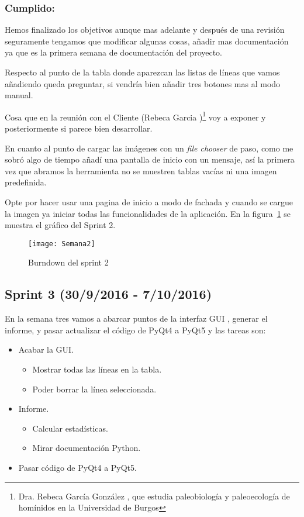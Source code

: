 \subsubsection{Cumplido:}
Hemos finalizado los objetivos aunque mas adelante y después de una revisión seguramente tengamos que modificar algunas cosas, añadir mas documentación ya que es la primera semana de documentación del proyecto.

Respecto al punto de la tabla donde aparezcan las listas de líneas que vamos añadiendo queda preguntar, si vendría bien añadir tres botones mas al modo manual.

Cosa que en la reunión con el Cliente (Rebeca Garcia \cite{Rebeca:garcia})\footnote{ Dra. Rebeca García González \cite{ubu:Rebe},  que estudia paleobiología y paleoecología de homínidos en la Universidad de Burgos} voy a exponer y posteriormente si parece bien desarrollar.

En cuanto al punto de cargar las imágenes con un \textit{file chooser} de paso, como me sobró algo de tiempo añadí una pantalla de inicio con un mensaje, así la primera vez que abramos la herramienta no se muestren tablas vacías ni una imagen predefinida.

Opte por hacer usar una pagina de inicio a modo de fachada y cuando se cargue la imagen ya iniciar todas las funcionalidades de la aplicación.
En la figura~\ref{fig:A.2.2} se muestra el gráfico del Sprint 2.
\begin{figure}[h]
\centering
\texttt{[image: Semana2]}
\caption{Burndown del sprint 2}
\label{fig:A.2.2}
\end{figure}

\subsection{Sprint 3 (30/9/2016 - 7/10/2016)}
En la semana tres vamos a abarcar puntos de la interfaz GUI , generar el informe, y pasar actualizar  el código de PyQt4 a PyQt5 y las tareas son:

\begin{itemize}
	\item Acabar la GUI.
		\begin{itemize}
			\item Mostrar todas las líneas en la tabla.
			\item Poder borrar la línea seleccionada.
		\end{itemize} 
	\item Informe.
		\begin{itemize}
			\item Calcular estadísticas.
			\item Mirar documentación Python.
		\end{itemize}
	\item Pasar código de PyQt4 a PyQt5.
\end{itemize}
